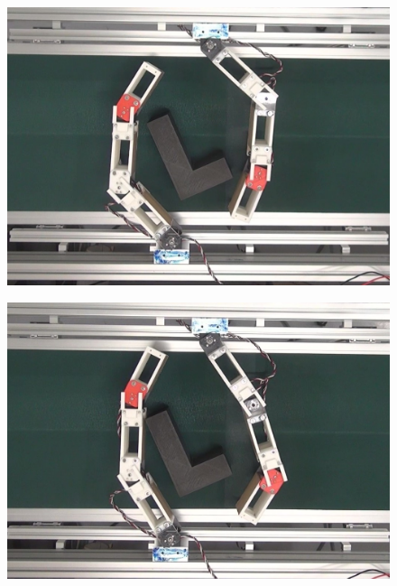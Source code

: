 \documentclass[a4paper,twoside,12pt,papersize, dvipdfmx]{iirthesis}
\begin{document}
\begin{figure}[hbt]
\centering
\begin{minipage}{0.249\hsize}
\centering
\includegraphics[width=0.98\hsize]{fig/4-manipulation-result/LShape/1-1.jpg}
\subcaption{}\label{}
\end{minipage}\hfill
\begin{minipage}{0.249\hsize}
\centering
\includegraphics[width=0.98\hsize]{fig/4-manipulation-result/LShape/1-2.jpg}
\subcaption{}\label{}
\end{minipage}\hfill
\begin{minipage}{0.249\hsize}
\centering

\end{minipage}
\end{figure}
\end{document}
